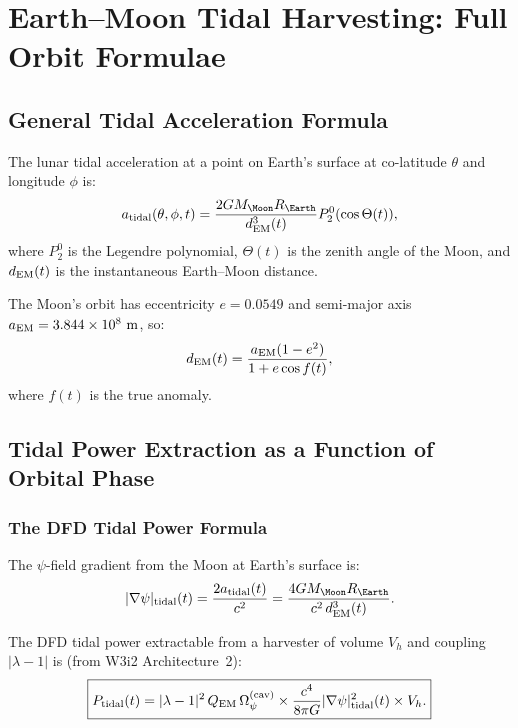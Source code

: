 \documentclass[aps,prd,twocolumn,superscriptaddress]{revtex4-2}
\newcommand{\Opsi}{\Omega_\psi}
\newcommand{\lam}{|\lambda-1|}
\begin{document}
\section{Earth--Moon Tidal Harvesting: Full Orbit Formulae}
\label{sec:tidal}

\subsection{General Tidal Acceleration Formula}

The lunar tidal acceleration at a point on Earth's surface at
co-latitude $\theta$ and longitude $\phi$ is:
\begin{equation}
a_{\rm tidal}(\theta,\phi,t) = \frac{2GM_\Moon R_\Earth}{d_{\rm EM}^3(t)}
P_2^0(\cos\Theta(t)),
\end{equation}
where $P_2^0$ is the Legendre polynomial, $\Theta(t)$ is the zenith
angle of the Moon, and $d_{\rm EM}(t)$ is the instantaneous Earth--Moon
distance.

The Moon's orbit has eccentricity $e = 0.0549$ and semi-major axis
$a_{\rm EM} = 3.844\times 10^8~\mathrm{m}$, so:
\begin{equation}
d_{\rm EM}(t) = \frac{a_{\rm EM}(1-e^2)}{1 + e\cos f(t)},
\end{equation}
where $f(t)$ is the true anomaly.

\subsection{Tidal Power Extraction as a Function of Orbital Phase}

\subsubsection{The DFD Tidal Power Formula}

The $\psi$-field gradient from the Moon at Earth's surface is:
\begin{equation}
|\nabla\psi|_{\rm tidal}(t) = \frac{2a_{\rm tidal}(t)}{c^2}
= \frac{4GM_\Moon R_\Earth}{c^2\,d_{\rm EM}^3(t)}.
\end{equation}

The DFD tidal power extractable from a harvester of volume $V_h$
and coupling $\lam$ is (from W3i2 Architecture~2):
\begin{equation}
\boxed{
P_{\rm tidal}(t) = \lam^2\,Q_{\rm EM}\,\Opsi^{(\rm cav)}
\times\frac{c^4}{8\pi G}|\nabla\psi|_{\rm tidal}^2(t)\times V_h.
}
\end{equation}
\end{document}
